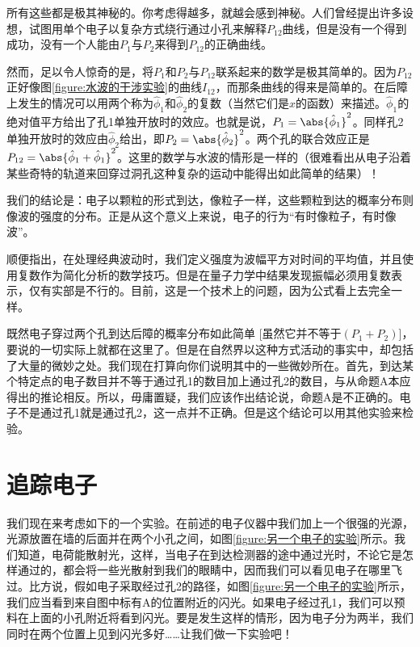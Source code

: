 所有这些都是极其神秘的。你考虑得越多，就越会感到神秘。人们曾经提出许多设想，试图用单个电子以复杂方式绕行通过小孔来解释$P_{12}$曲线，但是没有一个得到成功，没有一个人能由$P_1$与$P_2$来得到$P_{12}$的正确曲线。

然而，足以令人惊奇的是，将$P_1$和$P_2$与$P_{12}$联系起来的数学是极其简单的。因为$P_{12}$正好像图\ref{figure:水波的干涉实验}的曲线$I_{12}$，而那条曲线的得来是简单的。在后障上发生的情况可以用两个称为$\hat{\phi}_1$和$\hat{\phi}_2$的复数（当然它们是$x$的函数）来描述。$\hat{\phi}_1$的绝对值平方给出了孔1单独开放时的效应。也就是说，$P_1 = \abs{\hat{\phi}_1}^2$。同样孔2单独开放时的效应由$\hat{\phi}_2$给出，即$P_2 = \abs{\hat{\phi}_2}^2$。两个孔的联合效应正是$P_{12} = \abs{\hat{\phi}_1 + \hat{\phi}_1}^2$。这里的数学与水波的情形是一样的（很难看出从电子沿着某些奇特的轨道来回穿过洞孔这种复杂的运动中能得出如此简单的结果）！

我们的结论是：电子以颗粒的形式到达，像粒子一样，这些颗粒到达的概率分布则像波的强度的分布。正是从这个意义上来说，电子的行为“有时像粒子，有时像波”。

顺便指出，在处理经典波动时，我们定义强度为波幅平方对时间的平均值，并且使用复数作为简化分析的数学技巧。但是在量子力学中结果发现振幅必须用复数表示，仅有实部是不行的。目前，这是一个技术上的问题，因为公式看上去完全一样。

既然电子穿过两个孔到达后障的概率分布如此简单 [虽然它并不等于$(P_1+P_2)$]，要说的一切实际上就都在这里了。但是在自然界以这种方式活动的事实中，却包括了大量的微妙之处。我们现在打算向你们说明其中的一些微妙所在。首先，到达某个特定点的电子数目并不等于通过孔1的数目加上通过孔2的数目，与从命题A本应得出的推论相反。所以，毋庸置疑，我们应该作出结论说，命题A是不正确的。电子不是通过孔1就是通过孔2，这一点并不正确。但是这个结论可以用其他实验来检验。

\section{追踪电子}

我们现在来考虑如下的一个实验。在前述的电子仪器中我们加上一个很强的光源，光源放置在墙的后面并在两个小孔之间，如图\ref{figure:另一个电子的实验}所示。我们知道，电荷能散射光，这样，当电子在到达检测器的途中通过光时，不论它是怎样通过的，都会将一些光散射到我们的眼睛中，因而我们可以看见电子在哪里飞过。比方说，假如电子采取经过孔2的路径，如图\ref{figure:另一个电子的实验}所示，我们应当看到来自图中标有A的位置附近的闪光。如果电子经过孔1，我们可以预料在上面的小孔附近将看到闪光。要是发生这样的情形，因为电子分为两半，我们同时在两个位置上见到闪光多好……让我们做一下实验吧！

